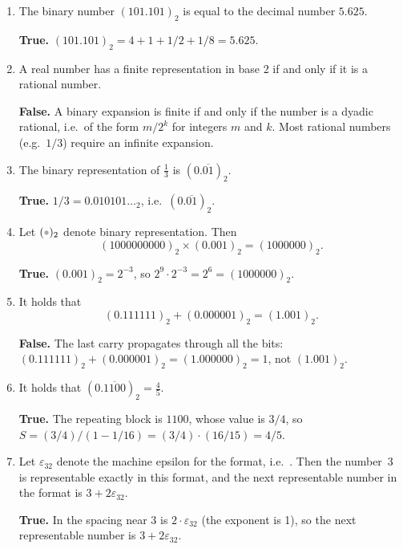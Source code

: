 \documentclass[a4paper]{article}
\newcommand{\answer}[1]{%
    \ifdefined\showsolutions
        \par\smallskip
        {\small\color{blue!60!black}#1\par}
    \fi
}
\begin{document}
\begin{enumerate}

    \item
        The binary number $(101.101)_2$ is equal to the decimal number $5.625$.
        \answer{\textbf{True.}
        $(101.101)_2 = 4 + 1 + 1/2 + 1/8 = 5.625$.}

    \item
        A real number has a finite representation in base 2 if and only if it is a
        rational number.
        \answer{\textbf{False.}
        A binary expansion is finite if and only if the number is a
        dyadic rational, i.e.\ of the form $m/2^k$ for integers
        $m$ and $k$. Most rational numbers (e.g.\ $1/3$) require an
        infinite expansion.}

    \item
        The binary representation of $\frac{1}{3}$ is $(0.\overline{01})_2$.
        \answer{\textbf{True.}
        $1/3 = 0.010101\dotsc_2$, i.e.\ $(0.\overline{01})_2$.}

    \item
        Let $(\placeholder)_2$ denote binary representation.
        Then
        \[
            (1000000000)_2 \times (0.001)_2 = (1000000)_2.
        \]
        \answer{\textbf{True.}
        $(0.001)_2 = 2^{-3}$, so
        $2^9 \cdot 2^{-3} = 2^6 = (1000000)_2$.}

    \item
        It holds that
        \[
            (0.111111)_2 + (0.000001)_2 = (1.001)_2.
        \]
        \answer{\textbf{False.}
        The last carry propagates through all the bits:
        $(0.111111)_2 + (0.000001)_2 = (1.000000)_2 = 1$, not
        $(1.001)_2$.}

    \item
        It holds that $(0.\overline{1100})_2 = \frac{4}{5}$.
        \answer{\textbf{True.}
        The repeating block is $1100$, whose value is $3/4$, so
        $S = (3/4)/(1 - 1/16) = (3/4) \cdot (16/15) = 4/5$.}

    \item
        Let $\varepsilon_{32}$ denote the machine epsilon for the  format,
        i.e.\ .
        Then the number~3 is representable exactly in this format,
        and the next representable number in the  format is
        $3 + 2\varepsilon_{32}$.
        \answer{\textbf{True.}
        In  the spacing near 3 is
        $2 \cdot \varepsilon_{32}$ (the exponent is 1), so the next
        representable number is $3 + 2\varepsilon_{32}$.}


\end{enumerate}
\end{document}
